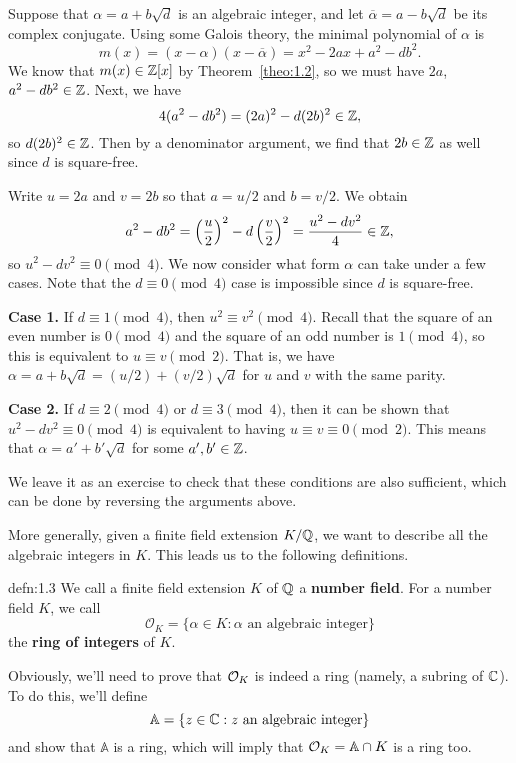 Suppose that $\alpha = a + b\sqrt{d}$ is an algebraic integer, and let 
$\overline\alpha = a - b\sqrt{d}$ be its complex conjugate. Using some 
Galois theory, the minimal polynomial of $\alpha$ is 
\[ m(x) = (x - \alpha)(x - \overline\alpha) = x^2 - 2ax + a^2 - db^2. \] 
We know that $m(x) \in \mathbb{Z}[x]$ by Theorem~\ref{theo:1.2}, so we must have 
$2a$, $a^2 - db^2 \in \mathbb{Z}$. Next, we have 
\[ 4(a^2 - db^2) = (2a)^2 - d(2b)^2 \in \mathbb{Z}, \] 
so $d(2b)^2 \in \mathbb{Z}$. Then by a denominator argument, we find that 
$2b \in \mathbb{Z}$ as well since $d$ is square-free.

Write $u = 2a$ and $v = 2b$ so that $a = u/2$ and $b = v/2$. We obtain 
\[ a^2 - db^2 = \left(\frac{u}{2}\right)^2 - d\left(\frac{v}{2}\right)^2 
= \frac{u^2 - dv^2}{4} \in \mathbb{Z}, \] 
so $u^2 - dv^2 \equiv 0 \pmod 4$. We now consider what form $\alpha$ 
can take under a few cases. Note that the $d \equiv 0 \pmod 4$ case is 
impossible since $d$ is square-free. 

\textbf{Case 1.} If $d \equiv 1 \pmod 4$, then $u^2 \equiv v^2 \pmod 4$. 
Recall that the square of an even number is $0 \pmod 4$ and the square 
of an odd number is $1 \pmod 4$, so this is equivalent to $u \equiv v \pmod 2$. 
That is, we have $\alpha = a + b\sqrt{d} = (u/2) + (v/2)\sqrt{d}$ for $u$ 
and $v$ with the same parity.

\textbf{Case 2.} If $d \equiv 2 \pmod 4$ or $d \equiv 3 \pmod 4$, then 
it can be shown that $u^2 - dv^2 \equiv 0 \pmod 4$ is equivalent to having 
$u \equiv v \equiv 0 \pmod 2$. This means that $\alpha = a' + b'\sqrt{d}$ for 
some $a', b' \in \mathbb{Z}$. 

We leave it as an exercise to check that these conditions are also sufficient, 
which can be done by reversing the arguments above.

More generally, given a finite field extension $K/\mathbb{Q}$, we want to describe 
all the algebraic integers in $K$. This leads us to the following definitions.

\begin{defn}{defn:1.3}
    We call a finite field extension $K$ of $\mathbb{Q}$ a {\bf number field}.
    For a number field $K$, we call 
    \[ \mathcal{O}_K = \{\alpha \in K : \alpha \text{ an algebraic integer}\} \] 
    the {\bf ring of integers} of $K$.
\end{defn}\vspace{-0.25cm}

Obviously, we'll need to prove that ${\cal O}_K$ is indeed a ring (namely, 
a subring of $\mathbb{C}$). To do this, we'll define 
\[ \mathbb{A} = \{z \in \mathbb{C} : z \text{ an algebraic integer}\} \] 
and show that $\mathbb{A}$ is a ring, which will imply that ${\cal O}_K 
= \mathbb{A} \cap K$ is a ring too. 

